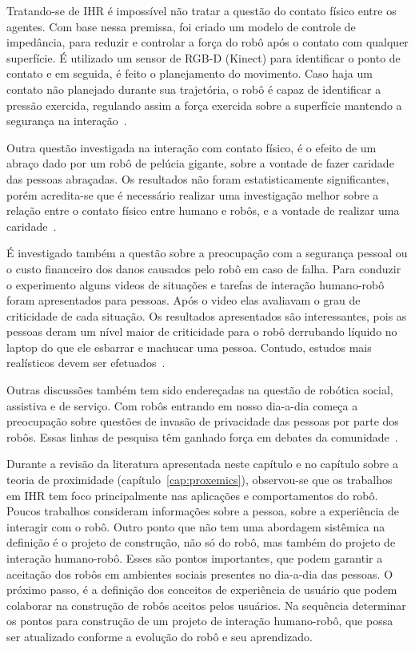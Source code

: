 Tratando-se de IHR é impossível não tratar a questão do contato físico entre os agentes. Com base nessa premissa, foi criado um modelo de controle de impedância, para reduzir e controlar a força do robô após o contato com qualquer superfície. É utilizado um sensor de RGB-D (Kinect) para identificar o ponto de contato e em seguida, é feito o planejamento do movimento. Caso haja um contato não planejado durante sua trajetória, o robô é capaz de identificar a pressão exercida, regulando assim a força exercida sobre a superfície mantendo a segurança na interação~\cite{magrini:2015}.

Outra questão investigada na interação com contato físico, é o efeito de um abraço dado por um robô de pelúcia gigante, sobre a vontade de fazer caridade das pessoas abraçadas. Os resultados não foram estatisticamente significantes, porém acredita-se que é necessário realizar uma investigação melhor sobre a relação entre o contato físico entre humano e robôs, e a vontade de realizar uma caridade~\cite{nakata:2017}.

É investigado também a questão sobre a preocupação com a segurança pessoal ou o custo financeiro dos danos causados pelo robô em caso de falha. Para conduzir o experimento alguns videos de situações e tarefas de interação humano-robô foram apresentados para pessoas. Após o video elas avaliavam o grau de criticidade de cada situação.
Os resultados apresentados são interessantes, pois as pessoas deram um nível maior de criticidade para o robô derrubando líquido no laptop do que ele esbarrar e machucar uma pessoa. Contudo, estudos mais realísticos devem ser efetuados~\cite{adubor:2017}.

Outras discussões também tem sido endereçadas na questão de robótica social, assistiva e de serviço. Com robôs entrando em nosso dia-a-dia começa a preocupação sobre questões de invasão de privacidade das pessoas por parte dos robôs. Essas linhas de pesquisa têm ganhado força em debates da comunidade~\cite{rueben:2017}.

Durante a revisão da literatura apresentada neste capítulo e no capítulo sobre a teoria de proximidade (capítulo~\ref{cap:proxemics}), observou-se que os trabalhos em IHR tem foco principalmente nas aplicações e comportamentos do robô. Poucos trabalhos consideram informações sobre a pessoa, sobre a experiência de interagir com o robô. Outro ponto que não tem uma abordagem sistêmica na definição é o projeto de construção, não só do robô, mas também do projeto de interação humano-robô. Esses são pontos importantes, que podem garantir a aceitação dos robôs em ambientes sociais presentes no dia-a-dia das pessoas. O próximo passo, é a definição dos conceitos de experiência de usuário que podem colaborar na construção de robôs aceitos pelos usuários. Na sequência determinar os pontos para construção de um projeto de interação humano-robô, que possa ser atualizado conforme a evolução do robô e seu aprendizado.

